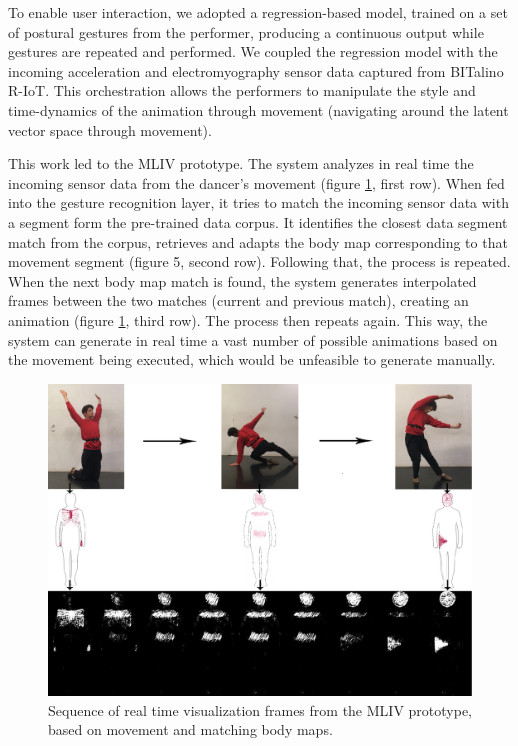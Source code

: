 To enable user interaction, we adopted a regression-based model, trained on a set of postural gestures from the performer, producing a continuous output while gestures are repeated and performed. We coupled the regression model with the incoming acceleration and electromyography sensor data captured from BITalino R-IoT. This orchestration allows the performers to manipulate the style and time-dynamics of the animation through movement (navigating around the latent vector space through movement).

This work led to the MLIV prototype. The system analyzes in real time the incoming sensor data from the dancer’s movement (figure \ref{fig:ml-screenshot}, first row). When fed into the gesture recognition layer, it tries to match the incoming sensor data with a segment form the pre-trained data corpus. It identifies the closest data segment match from the corpus, retrieves and adapts the body map corresponding to that movement segment (figure 5, second row). Following that, the process is repeated. When the next body map match is found, the system generates interpolated frames between the two matches (current and previous match), creating an animation (figure \ref{fig:ml-screenshot}, third row). The process then repeats again. This way, the system can generate in real time a vast number of possible animations based on the movement being executed, which would be unfeasible to generate manually.

\begin{figure}[ht]
  \centering
  \includegraphics[width=\linewidth]{Chapters/Figures/modi_dis/sensor-drawing-3rows-large.png}
  \caption[Sequence of visualisation frames generated by CAE model]{Sequence of real time visualization frames from the MLIV prototype, based on movement and matching body maps.}
    \label{fig:ml-screenshot}
\end{figure}

